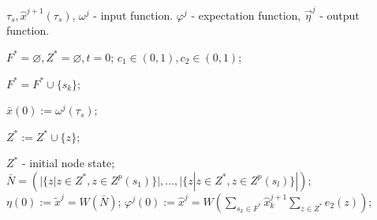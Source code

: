 		\Require $\tau_s, \hat x^{j+1}(\tau_s)$, $\omega^j$ - input function.
		\Ensure $\varphi^j$ - expectation function, $\vec\eta^j$ - output function.

		\State $F^*=\varnothing,Z^*=\varnothing,t=0$; 
		\State $c_1\in(0,1), c_2\in(0,1)$;

		\Statex {}
				
		 \label{alst:init_start}
			 \label{alst:select_f}
				\State $F^*=F^*\cup\{s_k\}$;
			\EndIf
		\EndFor
		
		\State $\bar x(0):=\omega^j(\tau_s)$;
		
				 \label{alst:select_z}
					\State $Z^*:=Z^*\cup\{z\}$;
				\EndIf
			\EndFor
		\EndFor
		
		\State $Z^*$ - initial node state; \label{alst:init_state}
		\State $\bar N=(|\{z|z\in Z^*,z\in Z^p(s_1)\}|,\dots,|\{z|z\in Z^*,z\in Z^p(s_l)\}|)$; \label{alst:init_calc_out2}
		\State $\eta(0):=\tilde x^j=W(\bar N)$; \label{alst:init_calc_out3}
		\State $\varphi^j(0):=\hat x^j=W(\sum_{s_k\in F^*}\hat x_k^{j+1}\sum_{z\in Z^*}e_2(z))$;\label{alst:init_control}
		\label{alst:init_end}